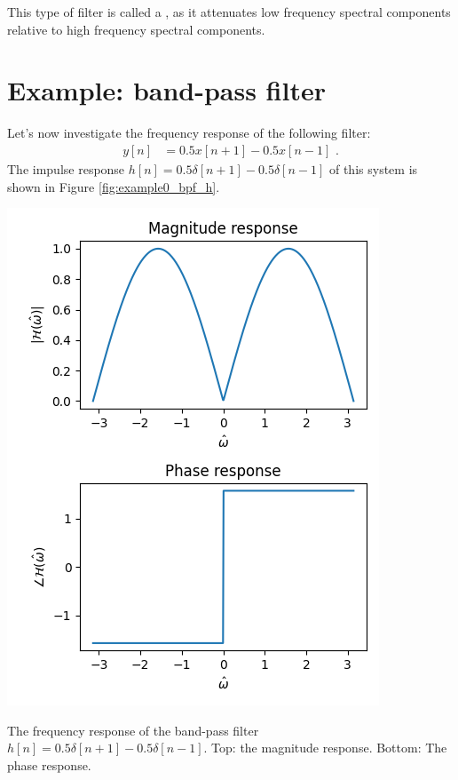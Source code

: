 This type of filter is called a \emph{}, as it attenuates low frequency spectral
components relative to high frequency spectral components.

\section{Example: band-pass filter}

Let's now investigate the frequency response of the following filter:
\begin{align}
y[n] & = 0.5 x[n+1] - 0.5 x[n-1] \,\,.
\end{align}
The impulse response  $h[n]=0.5\delta[n+1]-0.5\delta[n-1]$ of this system is shown in Figure \ref{fig:example0_bpf_h}.

\begin{marginfigure}
\begin{center}
\includegraphics[width=\textwidth]{code/019_frequency_response/bpf_fresp.png}
\end{center}
\caption{The frequency response of the band-pass filter $h[n]=0.5\delta[n+1]-0.5\delta[n-1]$. Top: the magnitude response. Bottom: The phase response.}
\label{fig:example_bpf_fresp}
\end{marginfigure}

